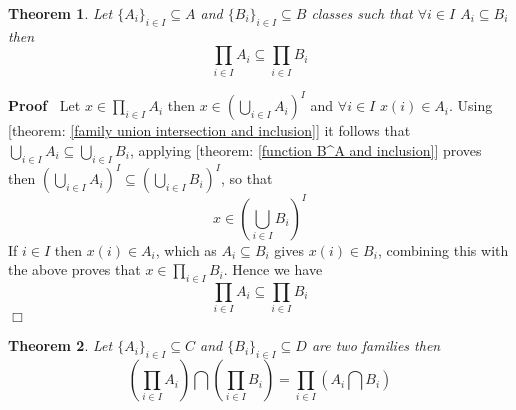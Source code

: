 \documentclass{book}
\newenvironment{proof}{\noindent\textbf{Proof\ }}{\hspace*{\fill}$\Box$\medskip}
\newtheorem{theorem}{Theorem}
\begin{document}
\begin{theorem}
  \label{product inclusion}Let $\{ A_i \}_{i \in I} \subseteq A$ and $\{ B_i
  \}_{i \in I} \subseteq B$ classes such that $\forall i \in I$ $A_i \subseteq
  B_i$ then
  \[ \prod_{i \in I} A_i \subseteq \prod_{i \in I} B_i \]
\end{theorem}

\begin{proof}
  Let $x \in \prod_{i \in I} A_i$ then $x \in \left( \bigcup_{i \in I} A_i
  \right)^I$ and $\forall i \in I$ $x (i) \in A_i$. Using [theorem:
  \ref{family union intersection and inclusion}] it follows that $\bigcup_{i
  \in I} A_i \subseteq \bigcup_{i \in I} B_i$, applying [theorem:
  \ref{function B^A and inclusion}] proves then $\left( \bigcup_{i \in I} A_i
  \right)^I \subseteq \left( \bigcup_{i \in I} B_i \right)^I$, so that
  \[ x \in \left( \bigcup_{i \in I} B_i \right)^I \]
  If $i \in I$ then $x (i) \in A_i$, which as $A_i \subseteq B_i$ gives $x (i)
  \in B_i$, combining this with the above proves that $x \in \prod_{i \in I}
  B_i$. Hence we have
  \[ \prod_{i \in I} A_i \subseteq \prod_{i \in I} B_i \]
\end{proof}

\begin{theorem}
  \label{product and intersection}Let $\{ A_i \}_{i \in I} \subseteq C$ and
  $\{ B_i \}_{i \in I} \subseteq D$ are two families then
  \[ \left( \prod_{i \in I} A_i \right) \bigcap \left( \prod_{i \in I} B_i
     \right) = \prod_{i \in I} \left( A_i \bigcap B_i \right) \]
\end{theorem}
\end{document}
